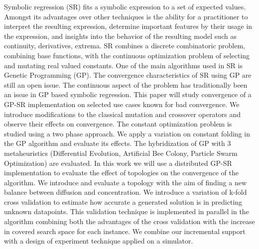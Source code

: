 Symbolic regression (SR) fits a symbolic expression to a set of expected values.
Amongst its advantages over other techniques is the ability for a practitioner to interpret the resulting expression, determine important features by their usage in the expression, and insights into the behavior of the resulting model such as continuity, derivatives, extrema.
SR combines a discrete combinatoric problem, combining base functions, with the continuous optimization problem of selecting and mutating real valued constants.
One of the main algorithms used in SR is Genetic Programming (GP). The convergence characteristics of SR using GP are still an open issue.
The continuous aspect of the problem has traditionally been an issue in GP based symbolic regression. This paper will study convergence of a GP-SR implementation on selected use cases known for bad convergence.
We introduce modifications to the classical mutation and crossover operators and observe their effects on convergence. 
The constant optimization problem is studied using a two phase approach. We apply a variation on constant folding in the GP algorithm and evaluate its effects. The hybridization of GP with 3 metaheuristics (Differential Evolution, Artificial Bee Colony, Particle Swarm Optimization) are evaluated. 
In this work we will use a distributed GP-SR implementation to evaluate the effect of topologies on the convergence of the algorithm.
We introduce and evaluate a topology with the aim of finding a new balance between diffusion and concentration.
We introduce a variation of k-fold cross validation to estimate how accurate a generated solution is in predicting unknown datapoints. This validation technique is implemented in parallel in the algorithm combining both the advantages of the cross validation with the increase in covered search space for each instance.
We combine our incremental support with a design of experiment technique applied on a simulator.
